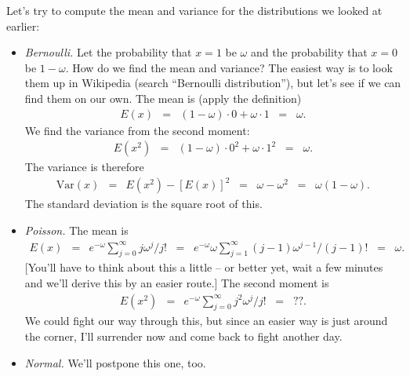 \documentclass[11pt]{article}
\begin{document}
Let's try to compute the mean and variance for the distributions
we looked at earlier:
%
\begin{itemize}
\item {\it Bernoulli.\/}
Let the probability that $x=1$ be $\omega$ and the probability that $x=0$ be $1-\omega$.
How do we find the mean and variance?
The easiest way is to look them up in Wikipedia (search ``Bernoulli distribution''),
but let's see if we can find them on our own.
The mean is (apply the definition)
\begin{eqnarray*}
    E(x) &=&  (1-\omega) \cdot 0 + \omega \cdot 1
            \;\;=\;\; \omega.
\end{eqnarray*}
We find the variance from the second moment:
\begin{eqnarray*}
    E(x^2) &=&  (1-\omega) \cdot 0^2 + \omega \cdot 1^2
            \;\;=\;\; \omega.
\end{eqnarray*}
The variance is therefore
\begin{eqnarray*}
    \mbox{Var}(x) &=& E(x^2) - [E(x)]^2
            \;\;=\;\;  \omega - \omega^2
            \;\;=\;\; \omega (1-\omega) .
\end{eqnarray*}
The standard deviation is the square root of this.


\item {\it Poisson.\/}
The mean is 
\begin{eqnarray*}
    E(x) &=& e^{-\omega} \sum_{j=0}^\infty j \omega^j/j!
            \;\;=\;\; e^{-\omega} \omega \sum_{j=1}^\infty (j-1) \omega^{j-1}/(j-1)!
            \;\;=\;\; \omega .
\end{eqnarray*}
[You'll have to think about this a little -- or better yet, wait a few minutes and
we'll derive this by an easier route.]
The second moment is
\begin{eqnarray*}
    E(x^2) &=& e^{-\omega} \sum_{j=0}^\infty j^2 \omega^j/j!
            \;\;=\;\;  ??.
\end{eqnarray*}
We could fight our way through this,
but since an easier way is just around the corner,
I'll surrender now and come back to fight another day.


\item {\it Normal.\/}
We'll postpone this one, too.
\end{itemize}
\end{document}

